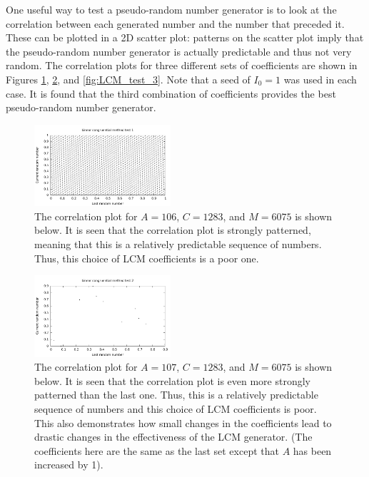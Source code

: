 \documentclass[twocolumn]{myarticle}
\begin{document}
One useful way to test a pseudo-random number generator is to look at the correlation between each generated number and the number that preceded it.
These can be plotted in a 2D scatter plot: patterns on the scatter plot imply that the pseudo-random number generator is actually predictable and thus not very random.
The correlation plots for three different sets of coefficients are shown in Figures \ref{fig:LCM_test_1}, \ref{fig:LCM_test_2}, and \ref{fig:LCM_test_3}.
Note that a seed of $ I_0 = 1 $ was used in each case.
It is found that the third combination of coefficients provides the best pseudo-random number generator.

\begin{figure}[ht!]
    \begin{center}
    \includegraphics[width = 0.45\textwidth]{../Plots/LCM_test_1.pdf}
    \caption{%
        The correlation plot for $ A = 106 $, $ C = 1283 $, and $ M = 6075 $ is shown below.
        It is seen that the correlation plot is strongly patterned, meaning that this is a relatively predictable sequence of numbers.
        Thus, this choice of LCM coefficients is a poor one.
    }
    \label{fig:LCM_test_1}
    \end{center}
\end{figure}

\begin{figure}[ht!]
    \begin{center}
    \includegraphics[width = 0.45\textwidth]{../Plots/LCM_test_2.pdf}
    \caption{%
        The correlation plot for $ A = 107 $, $ C = 1283 $, and $ M = 6075 $ is shown below.
        It is seen that the correlation plot is even more strongly patterned than the last one.
        Thus, this is a relatively predictable sequence of numbers and this choice of LCM coefficients is poor.
        This also demonstrates how small changes in the coefficients lead to drastic changes in the effectiveness of the LCM generator.
        (The coefficients here are the same as the last set except that $ A $ has been increased by 1).
    }
    \label{fig:LCM_test_2}
    \end{center}
\end{figure}
\end{document}

